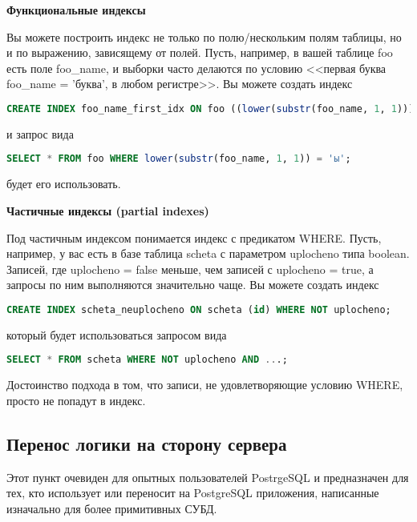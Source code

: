\textbf{Функциональные индексы}

Вы можете построить индекс не только по полю/нескольким полям таблицы, но и по выражению, зависящему от полей. Пусть, например, в вашей таблице foo есть поле foo\_name, и выборки часто делаются по условию <<первая буква foo\_name = 'буква', в любом регистре>>. Вы можете создать индекс

\begin{lstlisting}[language=SQL,label=lst:summary-indexes1,caption=Индекс]
CREATE INDEX foo_name_first_idx ON foo ((lower(substr(foo_name, 1, 1))));
\end{lstlisting}

и запрос вида

\begin{lstlisting}[language=SQL,label=lst:summary-indexes2,caption=Запрос]
SELECT * FROM foo WHERE lower(substr(foo_name, 1, 1)) = 'ы';
\end{lstlisting}

будет его использовать.

\textbf{Частичные индексы (partial indexes)}

Под частичным индексом понимается индекс с предикатом WHERE. Пусть, например, у вас есть в базе таблица scheta с параметром uplocheno типа boolean. Записей, где uplocheno = false меньше, чем записей с uplocheno = true, а запросы по ним выполняются значительно чаще. Вы можете создать индекс

\begin{lstlisting}[language=SQL,label=lst:summary-indexes3,caption=Индекс]
CREATE INDEX scheta_neuplocheno ON scheta (id) WHERE NOT uplocheno;
\end{lstlisting}

который будет использоваться запросом вида

\begin{lstlisting}[language=SQL,label=lst:summary-indexes4,caption=Запрос]
SELECT * FROM scheta WHERE NOT uplocheno AND ...;
\end{lstlisting}

Достоинство подхода в том, что записи, не удовлетворяющие условию WHERE, просто не попадут в индекс.


\subsection{Перенос логики на сторону сервера}

Этот пункт очевиден для опытных пользователей PostrgeSQL и предназначен для тех, кто использует или переносит на PostgreSQL приложения, написанные изначально для более примитивных СУБД.

